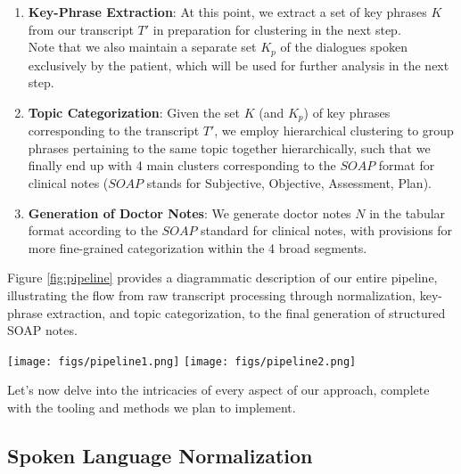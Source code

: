 \documentclass[11pt,a4paper]{article}
\begin{document}
\begin{enumerate}
    \item \textbf{Key-Phrase Extraction}: At this point, we extract a set of key phrases $K$ from our transcript $T'$ in preparation for clustering in the next step. \\ Note that we also maintain a separate set $K_p$ of the dialogues spoken exclusively by the patient, which will be used for further analysis in the next step. 
    \item \textbf{Topic Categorization}: Given the set $K$ (and $K_p$) of key phrases corresponding to the transcript $T'$, we employ hierarchical clustering to group phrases pertaining to the same topic together hierarchically, such that we finally end up with 4 main clusters corresponding to the $SOAP$ format for clinical notes ($SOAP$ stands for Subjective, Objective, Assessment, Plan). 
    \item \textbf{Generation of Doctor Notes}: We generate doctor notes $N$ in the tabular format according to the $SOAP$ standard for clinical notes, with provisions for more fine-grained categorization within the 4 broad segments.
\end{enumerate}

Figure \ref{fig:pipeline} provides a diagrammatic description of our entire pipeline, illustrating the flow from raw transcript processing through normalization, key-phrase extraction, and topic categorization, to the final generation of structured SOAP notes.\\

\begin{figure*}[t]
    \centering
    \texttt{[image: figs/pipeline1.png]}
    \texttt{[image: figs/pipeline2.png]}
    
    \caption{Our proposed pipeline for automated clinical documentation generation from doctor-patient conversations. The system processes raw transcripts through multiple stages including normalization, key-phrase extraction, topic categorization using hierarchical clustering, and finally generates structured SOAP notes.}
    \label{fig:pipeline}
\end{figure*}
Let's now delve into the intricacies of every aspect of our approach, complete with the tooling and methods we plan to implement.
\subsection{Spoken Language Normalization}
\end{document}
